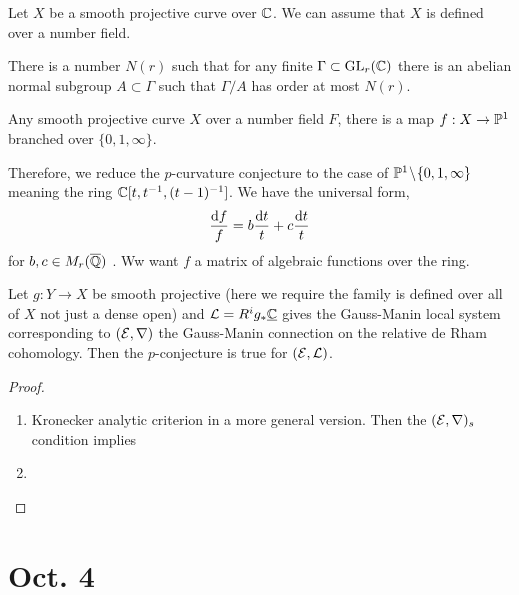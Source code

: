 \documentclass[12pt]{article}
\begin{document}
\begin{prop}
Let $X$ be a smooth projective curve over $\CC$. We can assume that $X$ is defined over a number field. 
\end{prop}

\begin{prop}[Jordan]
There is a number $N(r)$ such that for any finite $\Gamma \subset \GL_r(\CC)$ there is an abelian normal subgroup $A \subset \Gamma$ such that $\Gamma / A$ has order at most $N(r)$.
\end{prop}

\begin{theorem}[Belyi]
Any smooth projective curve $X$ over a number field $F$, there is a map $f : X \to \P^1$ branched over $\{ 0, 1, \infty \}$. 
\end{theorem}

\begin{cor}
Therefore, we reduce the $p$-curvature conjecture to the case of $\P^1 \sm \{ 0, 1, \infty \}$ meaning the ring $\CC[t, t^{-1}, (t-1)^{-1}]$. We have the universal form,
\[ \frac{\d{f}}{f} = b \frac{\d{t}}{t} + c \frac{\d{t}}{t} \]
for $b, c \in M_r(\overline{\Q})$ . Ww want $f$ a matrix of algebraic functions over the ring. 
\end{cor}

\begin{theorem}[Katz]
Let $g : Y \to X$ be smooth projective (here we require the family is defined over all of $X$ not just a dense open) and $\L = R^i g_* \underline{\CC}$ gives the Gauss-Manin local system corresponding to $(\E, \nabla)$ the Gauss-Manin connection on the relative de Rham cohomology. Then the $p$-conjecture is true for $(\E, \L)$. 
\end{theorem}

\begin{proof}
\begin{enumerate}
\item Kronecker analytic criterion in a more general version. Then the $(\E, \nabla)_s$ condition implies 

\item 
\end{enumerate}
\end{proof}

\section{Oct. 4}

\newcommand{\alg}{\mathrm{alg}}
\end{document}
